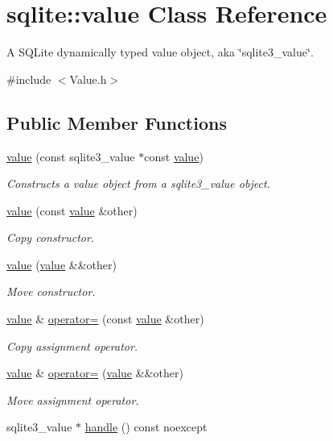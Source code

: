\hypertarget{a00015}{\section{sqlite\-:\-:value Class Reference}
\label{a00015}
}


A S\-Q\-Lite dynamically typed value object, aka \char`\"{}sqlite3\-\_\-value\char`\"{}.  




{\ttfamily \#include $<$Value.\-h$>$}

\subsection*{Public Member Functions}
\begin{DoxyCompactItemize}
\item 
\hyperlink{a00015_ad297a88d479f1818a65dadd726161785}{value} (const sqlite3\-\_\-value $\ast$const \hyperlink{a00015}{value})
\begin{DoxyCompactList}\small\item\em Constructs a value object from a sqlite3\-\_\-value object. \end{DoxyCompactList}\item 
\hyperlink{a00015_aa8e08aeebbd2a89075647a8418a7eae7}{value} (const \hyperlink{a00015}{value} \&other)
\begin{DoxyCompactList}\small\item\em Copy constructor. \end{DoxyCompactList}\item 
\hyperlink{a00015_a0ee5bf64b3377bd2ec6da01b066f62cb}{value} (\hyperlink{a00015}{value} \&\&other)
\begin{DoxyCompactList}\small\item\em Move constructor. \end{DoxyCompactList}\item 
\hyperlink{a00015}{value} \& \hyperlink{a00015_ab67e08529ef687899b08ad6fa50d4301}{operator=} (const \hyperlink{a00015}{value} \&other)
\begin{DoxyCompactList}\small\item\em Copy assignment operator. \end{DoxyCompactList}\item 
\hyperlink{a00015}{value} \& \hyperlink{a00015_aa3d30541555ecc3f54216ce80f2e482f}{operator=} (\hyperlink{a00015}{value} \&\&other)
\begin{DoxyCompactList}\small\item\em Move assignment operator. \end{DoxyCompactList}\item 
\hypertarget{a00015_a668839eab925862f57489429305be72d}{sqlite3\-\_\-value $\ast$ \hyperlink{a00015_a668839eab925862f57489429305be72d}{handle} () const noexcept}\label{a00015_a668839eab925862f57489429305be72d}


\end{DoxyCompactItemize}
